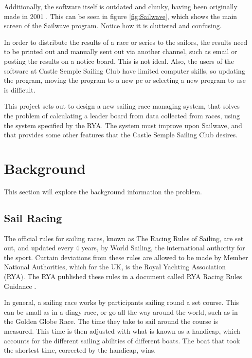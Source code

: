 \documentclass{l4proj}
\begin{document}
Additionally, the software itself is outdated and clunky, having been originally made in 2001 \citep{sailwave}. This can be seen in figure \ref{fig:Sailwave}, which shows the main screen of the Sailwave program. Notice how it is cluttered and confusing. 

In order to distribute the results of a race or series to the sailors, the results need to be printed out and manually sent out via another channel, such as email or posting the results on a notice board. This is not ideal. Also, the users of the software at Castle Semple Sailing Club have limited computer skills, so updating the program, moving the program to a new pc or selecting a new program to use is difficult.

This project sets out to design a new sailing race managing system, that solves the problem of calculating a leader board from data collected from races, using the system specified by the RYA. The system must improve upon Sailwave, and that provides some other features that the Castle Semple Sailing Club desires.


\chapter{Background}\label{chap:Back}
This section will explore the background information 
the problem.

\section{Sail Racing}
The official rules for sailing races, known as The Racing Rules of Sailing, are set out, and updated every 4 years, by World Sailing, the international authority for the sport. Curtain deviations from these rules are allowed to be made by Member National Authorities, which for the UK, is the Royal Yachting Association (RYA). The RYA published these rules in a document called RYA Racing Rules Guidance \citep{RYAscore}.

In general, a sailing race works by participants sailing round a set course. This can be small as in a dingy race, or go all the way around the world, such as in the Golden Globe Race. The time they take to sail around the course is measured. This time is then adjusted with what is known as a handicap, which accounts for the different sailing abilities of different boats. The boat that took the shortest time, corrected by the handicap, wins.
\end{document}
